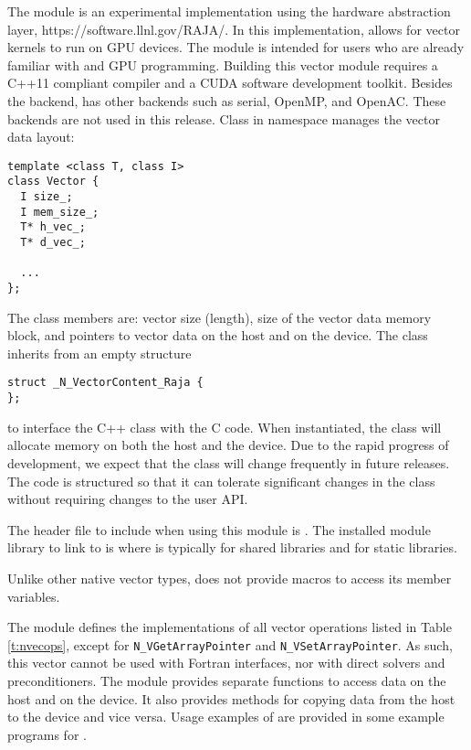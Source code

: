 %
The {\nvecraja} module is an experimental {\nvector} implementation using the {\raja} 
hardware abstraction layer, https://software.llnl.gov/RAJA/. In this implementation, {\raja}
allows for {\sundials} vector kernels to run on GPU devices. The module is intended for users 
who are already familiar with {\raja} and GPU programming. Building this vector 
module requires a C++11 compliant compiler and a CUDA software development toolkit. 
Besides the {\cuda} backend, {\raja} has other backends such as serial, OpenMP, 
and OpenAC. These backends are not used in this {\sundials} release.
Class  in namespace  manages the vector data layout:
\begin{verbatim} 
template <class T, class I>
class Vector {
  I size_;
  I mem_size_;
  T* h_vec_;
  T* d_vec_;
  
  ...
};
\end{verbatim}
The class members are: vector size (length), size of the vector data memory block, 
and pointers to vector data on the host and on the device. The class 
inherits from an empty structure
\begin{verbatim} 
struct _N_VectorContent_Raja {
};
\end{verbatim}
to interface the C++ class with the {\nvector} C code. When instantiated, the class
 will allocate memory on both the host and the device. Due to the rapid
progress of {\raja} development, we expect that the 
class will change frequently in future {\sundials} releases. The code is
structured so that it can tolerate significant changes in the 
 class without requiring changes to the user API.


The header file to include when using this module is .
The installed module library to link to is
where  is typically  for shared libraries
and  for static libraries.

Unlike other native {\sundials} vector types, {\nvecraja} does not provide macros 
to access its member variables.

The {\nvecraja} module defines the implementations of all vector operations listed 
in Table \ref{t:nvecops}, except for \verb|N_VGetArrayPointer| and 
\verb|N_VSetArrayPointer|. 
As such, this vector cannot be used with {\sundials} Fortran interfaces,
nor with {\sundials} direct solvers and preconditioners. 
The {\nvecraja} module provides separate functions to access data on the host
and on the device. It also provides methods for copying data from the host to 
the device and vice versa. Usage examples of {\nvecraja} are provided in
some example programs for {\cvode} \cite{cvode_ex}.

